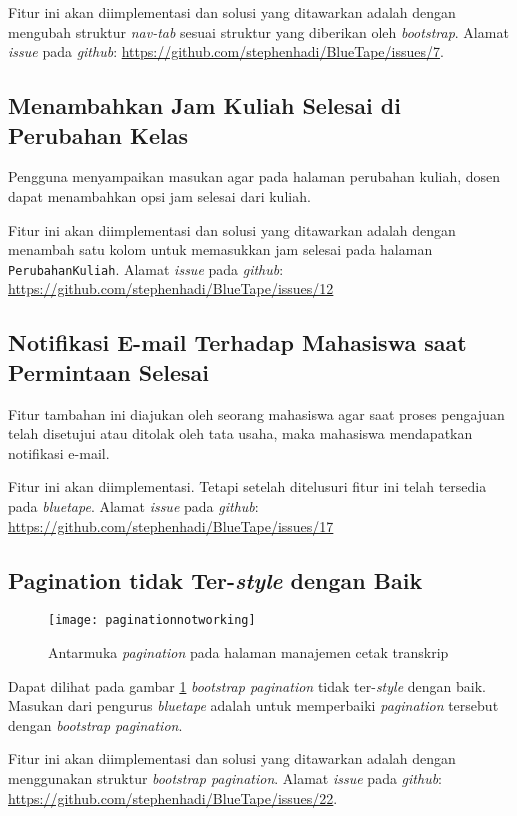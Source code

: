 Fitur ini akan diimplementasi dan solusi yang ditawarkan adalah dengan mengubah struktur \textit{nav-tab} sesuai struktur yang diberikan oleh \textit{bootstrap}. Alamat \textit{issue} pada \textit{github}: \url{https://github.com/stephenhadi/BlueTape/issues/7}.

\subsection{Menambahkan Jam Kuliah Selesai di Perubahan Kelas}
\label{issue:12}
Pengguna menyampaikan masukan agar pada halaman perubahan kuliah, dosen dapat menambahkan opsi jam selesai dari kuliah.

Fitur ini akan diimplementasi dan solusi yang ditawarkan adalah dengan menambah satu kolom untuk memasukkan jam selesai pada halaman \texttt{PerubahanKuliah}. Alamat \textit{issue} pada \textit{github}: \url{https://github.com/stephenhadi/BlueTape/issues/12}

\subsection{Notifikasi E-mail Terhadap Mahasiswa saat Permintaan Selesai}
\label{issue:17}
Fitur tambahan ini diajukan oleh seorang mahasiswa agar saat proses pengajuan telah disetujui atau ditolak oleh tata usaha, maka mahasiswa mendapatkan notifikasi e-mail.

Fitur ini akan diimplementasi. Tetapi setelah ditelusuri fitur ini telah tersedia pada \textit{bluetape}. Alamat \textit{issue} pada \textit{github}: \url{https://github.com/stephenhadi/BlueTape/issues/17}

\subsection{Pagination tidak Ter-\textit{style} dengan Baik}
\label{issue:22}
\begin{figure}[H]
	\centering
	\texttt{[image: paginationnotworking]} 
	\caption{Antarmuka \textit{pagination} pada halaman manajemen cetak transkrip}
	\label{fig:paginationmanajemencetaktranskrip}
\end{figure}
Dapat dilihat pada gambar \ref{fig:paginationmanajemencetaktranskrip} \textit{bootstrap pagination} tidak ter-\textit{style} dengan baik. Masukan dari pengurus \textit{bluetape} adalah untuk memperbaiki \textit{pagination} tersebut dengan \textit{bootstrap pagination}.

Fitur ini akan diimplementasi dan solusi yang ditawarkan adalah dengan menggunakan struktur \textit{bootstrap pagination}. Alamat \textit{issue} pada \textit{github}: \url{https://github.com/stephenhadi/BlueTape/issues/22}. 

